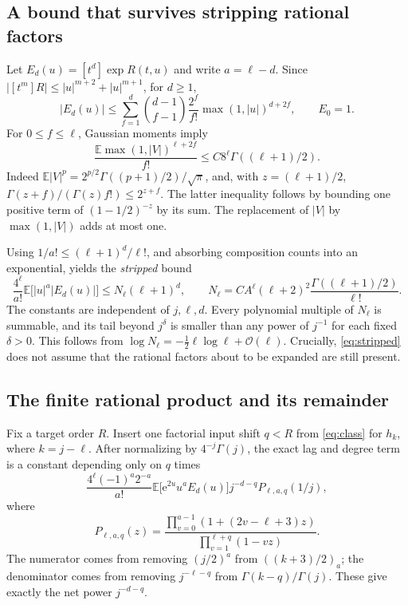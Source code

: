 \documentclass[11pt,letterpaper]{article}
\numberwithin{equation}{section}
\theoremstyle{remark}\newtheorem{remark}[theorem]{Remark}
\newcommand{\E}{\mathbb E}
\newcommand{\e}{\mathrm e}
\newcommand{\Ord}{\mathcal O}
\begin{document}
\subsection{A bound that survives stripping rational factors}
Let $E_d(u)=[t^d]\exp R(t,u)$ and write $a=\ell-d$. Since
$|[t^m]R|\le|u|^{m+2}+|u|^{m+1}$, for $d\ge1$,
\begin{equation}\label{eq:Ed}
 |E_d(u)|\le\sum_{f=1}^d\binom{d-1}{f-1}\frac{2^f}{f!}
                         \max(1,|u|)^{d+2f},\qquad E_0=1.
\end{equation}
For $0\le f\le\ell$, Gaussian moments imply
\begin{equation}\label{eq:gaussmoment}
 \frac{\E\max(1,|V|)^{\ell+2f}}{f!}
 \le C8^\ell\Gamma((\ell+1)/2).
\end{equation}
Indeed $\E|V|^p=2^{p/2}\Gamma((p+1)/2)/\sqrt\pi$, and, with $z=(\ell+1)/2$,
$\Gamma(z+f)/(\Gamma(z)f!)\le2^{z+f}$. The latter inequality follows by bounding one positive term of $(1-1/2)^{-z}$ by its sum. The replacement of $|V|$ by $\max(1,|V|)$ adds at most one.

Using $1/a!\le(\ell+1)^d/\ell!$, and absorbing composition counts into an exponential, yields the \emph{stripped} bound
\begin{equation}\label{eq:stripped}
 \frac{4^\ell}{a!}\E\bigl[|u|^a|E_d(u)|\bigr]
 \le N_\ell(\ell+1)^d,
 \qquad
 N_\ell=C A^\ell(\ell+2)^2\frac{\Gamma((\ell+1)/2)}{\ell!}.
\end{equation}
The constants are independent of $j,\ell,d$. Every polynomial multiple of $N_\ell$ is summable, and its tail beyond $j^\delta$ is smaller than any power of $j^{-1}$ for each fixed $\delta>0$. This follows from $\log N_\ell=-\tfrac12\ell\log\ell+\Ord(\ell)$. Crucially, \eqref{eq:stripped} does not assume that the rational factors about to be expanded are still present.

\subsection{The finite rational product and its remainder}
Fix a target order $R$. Insert one factorial input shift $q<R$ from \eqref{eq:class} for $h_k$, where $k=j-\ell$. After normalizing by $4^{-j}\Gamma(j)$, the exact lag and degree term is a constant depending only on $q$ times
\begin{equation}\label{eq:normalizedkernel}
 \frac{4^\ell(-1)^a2^{-a}}{a!}
 \E\bigl[\e^{2u}u^aE_d(u)\bigr]
 j^{-d-q}P_{\ell,a,q}(1/j),
\end{equation}
where
\begin{equation}\label{eq:P}
 P_{\ell,a,q}(z)=
 \frac{\prod_{v=0}^{a-1}(1+(2v-\ell+3)z)}
      {\prod_{v=1}^{\ell+q}(1-vz)}.
\end{equation}
The numerator comes from removing $(j/2)^a$ from $((k+3)/2)_a$; the denominator comes from removing $j^{-\ell-q}$ from $\Gamma(k-q)/\Gamma(j)$. These give exactly the net power $j^{-d-q}$.
\end{document}
